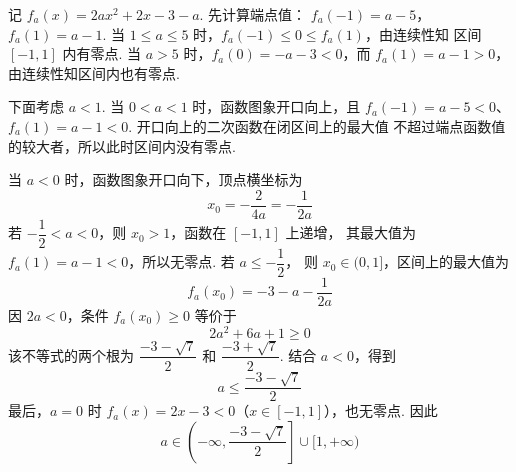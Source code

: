 \begin{solution}
记 \(f_a(x)=2ax^2+2x-3-a\). 先计算端点值：
\(f_a(-1)=a-5\)，\(f_a(1)=a-1\).
当 \(1\leqslant a\leqslant5\) 时，\(f_a(-1)\leqslant0\leqslant f_a(1)\)，由连续性知
区间 \([-1,1]\) 内有零点. 当 \(a>5\) 时，\(f_a(0)=-a-3<0\)，而
\(f_a(1)=a-1>0\)，由连续性知区间内也有零点.

下面考虑 \(a<1\). 当 \(0<a<1\) 时，函数图象开口向上，且
\(f_a(-1)=a-5<0\)、\(f_a(1)=a-1<0\). 开口向上的二次函数在闭区间上的最大值
不超过端点函数值的较大者，所以此时区间内没有零点.

当 \(a<0\) 时，函数图象开口向下，顶点横坐标为
\[
x_0=-\frac{2}{4a}=-\frac{1}{2a}
\]
若 \(-\dfrac{1}{2}<a<0\)，则 \(x_0>1\)，函数在 \([-1,1]\) 上递增，
其最大值为 \(f_a(1)=a-1<0\)，所以无零点. 若 \(a\leqslant-\dfrac{1}{2}\)，
则 \(x_0\in(0,1]\)，区间上的最大值为
\[
f_a(x_0)=-3-a-\frac{1}{2a}
\]
因 \(2a<0\)，条件 \(f_a(x_0)\geqslant0\) 等价于
\[
2a^2+6a+1\geqslant0
\]
该不等式的两个根为 \(\dfrac{-3-\sqrt{7}}{2}\) 和
\(\dfrac{-3+\sqrt{7}}{2}\). 结合 \(a<0\)，得到
\[
a\leqslant\frac{-3-\sqrt{7}}{2}
\]
最后，\(a=0\) 时 \(f_a(x)=2x-3<0\)（\(x\in[-1,1]\)），也无零点. 因此
\[
a\in\left(-\infty,\frac{-3-\sqrt{7}}{2}\right]\cup[1,+\infty)
\]
\end{solution}
